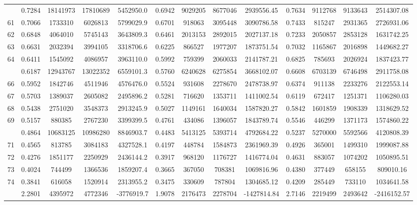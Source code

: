 \documentclass[
  12pt,
]{article}
\begin{document}
\begin{longtable}[t]{lcccccccccccc}
\addlinespace
60 & 0.7284 & 18141973 & 17810689 & 5452950.0 & 0.6942 & 9029205 & 8677046 & 2939556.45 & 0.7634 & 9112768 & 9133643 & 2514307.08\\
61 & 0.7066 & 1733310 & 6026813 & 5799029.9 & 0.6701 & 918063 & 3095448 & 3090786.58 & 0.7433 & 815247 & 2931365 & 2726931.06\\
62 & 0.6848 & 4064010 & 5745143 & 3643809.3 & 0.6461 & 2013153 & 2892015 & 2027137.18 & 0.7233 & 2050857 & 2853128 & 1631742.25\\
63 & 0.6631 & 2032394 & 3994105 & 3318706.6 & 0.6225 & 866527 & 1977207 & 1873751.54 & 0.7032 & 1165867 & 2016898 & 1449682.27\\
64 & 0.6411 & 1545092 & 4086957 & 3963110.0 & 0.5992 & 759399 & 2060033 & 2141787.21 & 0.6825 & 785693 & 2026924 & 1837423.77\\
\addlinespace
65 & 0.6187 & 12943767 & 13022352 & 6559101.3 & 0.5760 & 6240628 & 6275854 & 3668102.07 & 0.6608 & 6703139 & 6746498 & 2911758.08\\
66 & 0.5952 & 1842746 & 4511946 & 4576476.0 & 0.5524 & 931608 & 2278670 & 2478738.97 & 0.6374 & 911138 & 2233276 & 2122553.14\\
67 & 0.5703 & 1389037 & 2605082 & 2495896.2 & 0.5281 & 716620 & 1353711 & 1411002.54 & 0.6119 & 672417 & 1251371 & 1106280.03\\
68 & 0.5438 & 2751020 & 3548373 & 2913245.9 & 0.5027 & 1149161 & 1640034 & 1587820.27 & 0.5842 & 1601859 & 1908339 & 1318629.52\\
69 & 0.5157 & 880385 & 2767230 & 3399399.5 & 0.4761 & 434086 & 1396057 & 1843789.74 & 0.5546 & 446299 & 1371173 & 1574860.22\\
\addlinespace
70 & 0.4864 & 10683125 & 10986280 & 8846903.7 & 0.4483 & 5413125 & 5393714 & 4792684.22 & 0.5237 & 5270000 & 5592566 & 4120808.39\\
71 & 0.4565 & 813785 & 3084183 & 4327528.1 & 0.4197 & 448784 & 1584873 & 2361969.39 & 0.4926 & 365001 & 1499310 & 1999087.88\\
72 & 0.4276 & 1851177 & 2250929 & 2436144.2 & 0.3917 & 968120 & 1176727 & 1416774.04 & 0.4631 & 883057 & 1074202 & 1050895.51\\
73 & 0.4024 & 744499 & 1366536 & 1859207.4 & 0.3665 & 367050 & 708381 & 1069816.96 & 0.4380 & 377449 & 658155 & 809010.16\\
74 & 0.3841 & 616058 & 1520914 & 2313955.2 & 0.3475 & 330609 & 787804 & 1304685.12 & 0.4209 & 285449 & 733110 & 1034641.58\\
\addlinespace
75 & 2.2801 & 4395972 & 4772346 & -3776919.7 & 1.9078 & 2176473 & 2278704 & -1427814.84 & 2.7146 & 2219499 & 2493642 & -2416152.57\\*
\end{longtable}
\endgroup{}
\end{document}
